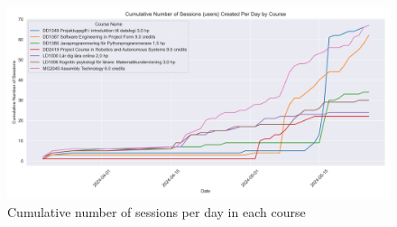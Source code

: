 \begin{figure}[H]
    \centering
    \includegraphics[width=\textwidth]{results/plots/assets/usage-07-number-of-sessions-per-day-and-course.png}
    \caption{Cumulative number of sessions per day in each course}
    \label{fig:usage_07_number_of_sessions_per_day_and_course}
\end{figure}